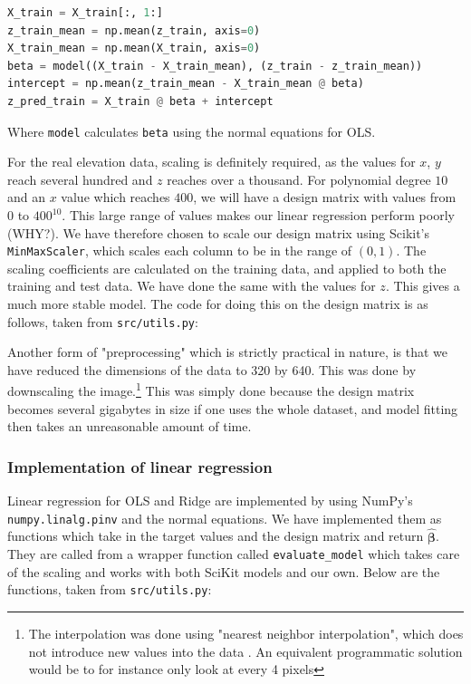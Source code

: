 \documentclass[twocolumn,10pt,cleanfoot]{asme2ej}
\begin{document}
\begin{lstlisting}[language=Python]
X_train = X_train[:, 1:]
z_train_mean = np.mean(z_train, axis=0)
X_train_mean = np.mean(X_train, axis=0)
beta = model((X_train - X_train_mean), (z_train - z_train_mean))
intercept = np.mean(z_train_mean - X_train_mean @ beta)
z_pred_train = X_train @ beta + intercept
\end{lstlisting}

Where \texttt{model} calculates \texttt{beta} using the normal equations for OLS.

For the real elevation data, scaling is definitely required, as the values for $x$, $y$ reach several hundred and $z$ reaches over a thousand. For polynomial degree $10$ and an $x$ value which reaches $400$, we will have a design matrix with values from $0$ to $400^{10}$. This large range of values makes our linear regression perform poorly (WHY?). We have therefore chosen to scale our design matrix using Scikit's \texttt{MinMaxScaler}, which scales each column to be in the range of $(0,1)$. The scaling coefficients are calculated on the training data, and applied to both the training and test data. We have done the same with the values for $z$. This gives a much more stable model. The code for doing this on the design matrix is as follows, taken from \texttt{src/utils.py}:



Another form of "preprocessing" which is strictly practical in nature, is that we have reduced the dimensions of the data to 320 by 640. This was done by downscaling the image.\footnote{The interpolation was done using "nearest neighbor interpolation", which does not introduce new values into the data \cite[77]{dip}. An equivalent programmatic solution would be to for instance only look at every 4 pixels} This was simply done because the design matrix becomes several gigabytes in size if one uses the whole dataset, and model fitting then takes an unreasonable amount of time.


\subsubsection{Implementation of linear regression}

Linear regression for OLS and Ridge are implemented by using NumPy's \texttt{numpy.linalg.pinv} and the normal equations. We have implemented them as functions which take in the target values and the design matrix and return $\bm{\hat{\beta}}$. They are called from a wrapper function called \texttt{evaluate\_model} which takes care of the scaling and works with both SciKit models and our own. Below are the functions, taken from \texttt{src/utils.py}:
\end{document}
